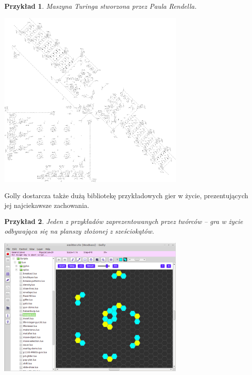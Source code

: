 \documentclass[declaration,shortabstract, inz]{iithesis}
\theoremstyle{definition} \newtheorem{definition}{Definicja}[]
\theoremstyle{plain} \newtheorem{remark}[definition]{Obserwacja}
\theoremstyle{plain} \newtheorem{theorem}[definition]{Twierdzenie}
\theoremstyle{plain} \newtheorem{example}{Przykład}[definition]
\theoremstyle{plain} \newtheorem{lemma}[definition]{Lemat}
\begin{document}
\begin{example}
Maszyna Turinga stworzona przez Paula Rendella.
	\begin{center}
		\includegraphics[width=0.7\textwidth]{GollyTuringMachine}
	\end{center}
\end{example}

Golly dostarcza także dużą bibliotekę przykładowych gier w życie, prezentujących jej najciekawsze zachowania.

\begin{example}
Jeden z przykładów zaprezentowanych przez twórców -- gra w życie odbywająca się na planszy złożonej z sześciokątów. 
	\begin{center}
		\includegraphics[width=0.7\textwidth]{hexaGolly}
	\end{center}
\end{example}
\end{document}
